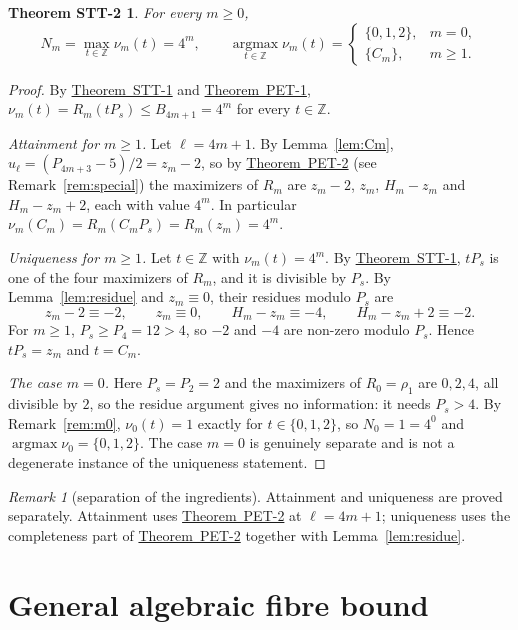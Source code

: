 \documentclass[11pt]{amsart}
\theoremstyle{definition}
\theoremstyle{remark}
\newtheorem{remark}[lemma]{Remark}
\theoremstyle{plain}
\newtheorem*{thmSTTtwo}{Theorem STT-2}
\numberwithin{equation}{section}
\newcommand{\Z}{\mathbb{Z}}
\newcommand{\argmax}{\operatorname*{argmax}}
\newcommand{\PETone}{\hyperref[thm:pet1]{Theorem~PET-1}}
\newcommand{\PETtwo}{\hyperref[thm:pet2]{Theorem~PET-2}}
\newcommand{\STTone}{\hyperref[thm:stt1]{Theorem~STT-1}}
\begin{document}
\begin{thmSTTtwo}\label{thm:stt2}
For every $m\ge0$,
\[
N_m=\max_{t\in\Z}\nu_m(t)=4^m,
\qquad
\argmax_{t\in\Z}\nu_m(t)=
\begin{cases}
\{0,1,2\}, & m=0,\\
\{C_m\}, & m\ge1.
\end{cases}
\]
\end{thmSTTtwo}

\begin{proof}
By \STTone{} and \PETone, $\nu_m(t)=R_m(tP_s)\le B_{4m+1}=4^m$ for every $t\in\Z$.

\emph{Attainment for $m\ge1$.} Let $\ell=4m+1$. By Lemma~\ref{lem:Cm},
$u_\ell=(P_{4m+3}-5)/2=z_m-2$, so by \PETtwo{} (see Remark~\ref{rem:special}) the maximizers of
$R_m$ are $z_m-2$, $z_m$, $H_m-z_m$ and $H_m-z_m+2$, each with value $4^m$. In particular
$\nu_m(C_m)=R_m(C_mP_s)=R_m(z_m)=4^m$.

\emph{Uniqueness for $m\ge1$.} Let $t\in\Z$ with $\nu_m(t)=4^m$. By \STTone, $tP_s$ is one of the four
maximizers of $R_m$, and it is divisible by $P_s$. By Lemma~\ref{lem:residue} and $z_m\equiv0$, their
residues modulo $P_s$ are
\[
z_m-2\equiv-2,\qquad z_m\equiv0,\qquad H_m-z_m\equiv-4,\qquad H_m-z_m+2\equiv-2 .
\]
For $m\ge1$, $P_s\ge P_4=12>4$, so $-2$ and $-4$ are non-zero modulo $P_s$. Hence $tP_s=z_m$ and
$t=C_m$.

\emph{The case $m=0$.} Here $P_s=P_2=2$ and the maximizers of $R_0=\rho_1$ are $0,2,4$, all divisible
by $2$, so the residue argument gives no information: it needs $P_s>4$. By Remark~\ref{rem:m0},
$\nu_0(t)=1$ exactly for $t\in\{0,1,2\}$, so $N_0=1=4^0$ and $\argmax\nu_0=\{0,1,2\}$. The case $m=0$
is genuinely separate and is not a degenerate instance of the uniqueness statement.
\end{proof}

\begin{remark}[separation of the ingredients]\label{rem:sep}
Attainment and uniqueness are proved separately. Attainment uses \PETtwo{} at $\ell=4m+1$;
uniqueness uses the completeness part of \PETtwo{} together with Lemma~\ref{lem:residue}.
\end{remark}

\section{General algebraic fibre bound}\label{sec:stt3}
\end{document}
